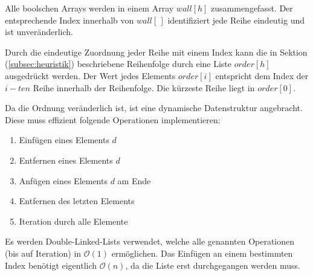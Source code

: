 \documentclass[a4paper, 12pt]{scrartcl}
\begin{document}
Alle boolschen Arrays werden in einem Array $wall[h]$ zusammengefasst. Der entsprechende Index innerhalb von $wall[\,]$ identifiziert jede Reihe eindeutig und ist unveränderlich.

Durch die eindeutige Zuordnung jeder Reihe mit einem Index kann die in Sektion (\ref{subsec:heuristik}) beschriebene Reihenfolge durch eine Liste $order[h]$ ausgedrückt werden. Der Wert jedes Elements $order[i]$ entspricht dem Index der $i-ten$ Reihe innerhalb der Reihenfolge. Die kürzeste Reihe liegt in $order[0]$.

Da die Ordnung veränderlich ist, ist eine dynamische Datenstruktur angebracht. Diese muss effizient folgende Operationen implementieren:
\begin{enumerate}
	\itemsep-2pt
	\item Einfügen eines Elements $d$
	\item Entfernen eines Elements $d$
	\item Anfügen eines Elements $d$ am Ende
	\item Entfernen des letzten Elements
	\item Iteration durch alle Elemente
\end{enumerate}
Es werden Double-Linked-Lists verwendet, welche alle genannten Operationen (bis auf Iteration) in $\mathcal{O}(1)$ ermöglichen. Das Einfügen an einem bestimmten Index benötigt eigentlich $\mathcal{O}(n)$, da die Liste erst durchgegangen werden muss.
\end{document}
